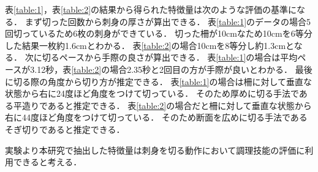 \begin{table}[ht]
    \centering
    \caption{そぎ切りの特徴量}
    \label{table:2}
\end{table}
表\ref{table:1}，表\ref{table:2}の結果から得られた特徴量は次のような評価の基準になる．
まず切った回数から刺身の厚さが算出できる．
表\ref{table:1}のデータの場合5回切っているため6枚の刺身ができている．
切った柵が10cmなため10cmを6等分した結果一枚約1.6cmとわかる．
表\ref{table:2}の場合10cmを8等分し約1.3cmとなる．
次に切るペースから手際の良さが算出できる．
表\ref{table:1}の場合は平均ペースが3.12秒，表\ref{table:2}の場合2.35秒と2回目の方が手際が良いとわかる．
最後に切る際の角度から切り方が推定できる．
表\ref{table:1}の場合は柵に対して垂直な状態から右に24度ほど角度をつけて切っている．
そのため厚めに切る手法である平造りであると推定できる．
表\ref{table:2}の場合だと柵に対して垂直な状態から右に44度ほど角度をつけて切っている．
そのため断面を広めに切る手法であるそぎ切りであると推定できる．

実験より本研究で抽出した特徴量は刺身を切る動作において調理技能の評価に利用できると考える．

